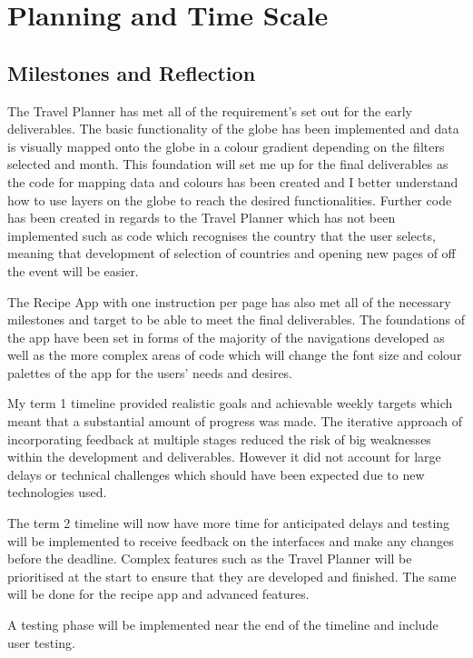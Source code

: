 \documentclass[]{project_interim}
\begin{document}
\chapter{Planning and Time Scale}
\section{Milestones and Reflection}
The Travel Planner has met all of the requirement’s set out for the early deliverables. The basic functionality of the globe has been implemented and data is visually mapped onto the globe in a colour gradient depending on the filters selected and month.
This foundation will set me up for the final deliverables as the code for mapping data and colours has been created and I better understand how to use layers on the globe to reach the desired functionalities.
Further code has been created in regards to the Travel Planner which has not been implemented such as code which recognises the country that the user selects, meaning that development of selection of countries and opening new pages of off the event will be easier.

The Recipe App with one instruction per page has also met all of the necessary milestones and target to be able to meet the final deliverables. The foundations of the app have been set in forms of the majority of the navigations developed as well as the more complex areas of code which will change the font size and colour palettes of the app for the users’ needs and desires.

My term 1 timeline provided realistic goals and achievable weekly targets which meant that a substantial amount of progress was made. The iterative approach of incorporating feedback at multiple stages reduced the risk of big weaknesses within the development and deliverables. However it did not account for large delays or technical challenges which should have been expected due to new technologies used.

The term 2 timeline will now have more time for anticipated delays and testing will be implemented to receive feedback on the interfaces and make any changes before the deadline. Complex features such as the Travel Planner will be prioritised at the start to ensure that they are developed and finished. The same will be done for the recipe app and advanced features.

A testing phase will be implemented near the end of the timeline and include user testing.
\end{document}
